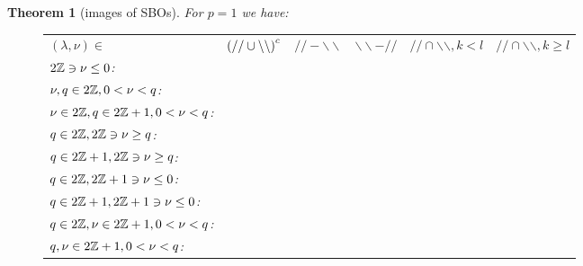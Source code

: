 \documentclass[12pt]{article} %
\newtheorem{theorem}{Theorem}
\theoremstyle{definition}
\theoremstyle{exampstyle} \newtheorem{examp}[theorem]{Theorem}
\newcommand{\even}{2\Z}
\newcommand{\odd}{2\Z+1}
\newcommand{\bb}{\backslash\backslash}
\renewcommand{\ss}{//}
\begin{document}
\begin{theorem}[images of SBOs]
	For $p=1$ we have:\\
	\begin{figure}[H]
		\hskip-3.6cm\begin{tabular}{p{4.5cm}p{2.5cm}p{2.5cm}p{2.5cm}p{2.5cm}p{2.5cm}}
		$(\lambda,\nu)\in$ & $\mybra{\ss\cup\bb}^c$ & $\ss-\bb$ & $\bb-\ss$ & $\ss\cap\bb,k<l$ & $\ss\cap\bb,k\geq l$\\
		\vspace{-0.7cm}$\even\ni\nu\le0$:&\\
		\vspace{-0.5cm}$\nu,q\in2\mathbb{Z},0<\nu<q$:&\\
		\vspace{-0.5cm}$\nu\in2\mathbb{Z},q\in2\mathbb{Z}+1,0<\nu<q$:&\\
		\vspace{-0.7cm}$q\in\even,\even\ni\nu\ge q$:&\\
		\vspace{-0.7cm}$q\in\odd,\even\ni\nu\ge q$:&\\
		\vspace{-0.7cm}$q\in\even,\odd\ni\nu\le0$:&\\
		\vspace{-0.7cm}$q\in\odd,\odd\ni\nu\le0$:&\\
		\vspace{-0.5cm}$q\in\even,\nu\in\odd,0<\nu<q$:&\\
		\vspace{-0.5cm}$q,\nu\in\odd,0<\nu<q$:&\\

\end{tabular}
\end{figure}
\end{theorem}
\end{document}
